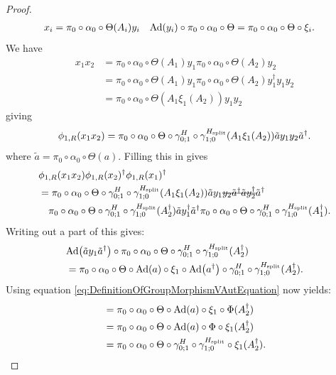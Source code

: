 \documentclass[11pt,a4paper,twoside]{article}
\numberwithin{equation}{section}
\begin{document}
\begin{proof}
		\begin{align}
			x_i&=\pi_0\circ\alpha_0\circ\Theta(A_i)y_i&\Ad{y_i}\circ\pi_0\circ\alpha_0\circ\Theta&=\pi_0\circ\alpha_0\circ\Theta\circ\xi_i.
		\end{align}
		We have
		\begin{align}
			x_1x_2&=\pi_0\circ\alpha_0\circ\Theta(A_1)y_1\pi_0\circ\alpha_0\circ\Theta(A_2)y_2\\
			&=\pi_0\circ\alpha_0\circ\Theta(A_1)y_1\pi_0\circ\alpha_0\circ\Theta(A_2)y_1^{\dagger}y_1y_2\\
			&=\pi_0\circ\alpha_0\circ\Theta(A_1\xi_1(A_2))y_1y_2
		\end{align}
		giving
		\begin{equation}
			\phi_{1,R}(x_1x_2)=\pi_0\circ\alpha_0\circ\Theta\circ\gamma^H_{0;1}\circ\gamma^{{H_{\text{split}}}}_{1;0}(A_1\xi_1(A_2))\tilde{a}y_1y_2\tilde{a}^\dagger.
		\end{equation}
		where $\tilde{a}=\pi_0\circ\alpha_0\circ\Theta(a)$. Filling this in gives
		\begin{align}
			&\phi_{1,R}(x_1x_2)\phi_{1,R}(x_2)^\dagger\phi_{1,R}(x_1)^\dagger\\
			\label{eq:HomomorphismCondition}
			&=\pi_0\circ\alpha_0\circ\Theta\circ\gamma^H_{0;1}\circ\gamma^{\Hsplit}_{1;0}(A_1\xi_1(A_2))\tilde{a}y_1\stkout{y_2\tilde{a}^\dagger \tilde{a}y_2^\dagger}\tilde{a}^\dagger\\
			\nonumber
			&\quad\pi_0\circ\alpha_0\circ\Theta\circ\gamma^H_{0;1}\circ\gamma^{\Hsplit}_{1;0}(A_2^\dagger)\tilde{a}y_1^\dagger\tilde{a}^\dagger \pi_0\circ\alpha_0\circ\Theta\circ\gamma^H_{0;1}\circ\gamma^{\Hsplit}_{1;0}(A_1^\dagger).
		\end{align}
		Writing out a part of this gives:
		\begin{align}
			&\Ad{\tilde{a}y_1\tilde{a}^\dagger}\circ\pi_0\circ\alpha_0\circ\Theta\circ\gamma^H_{0;1}\circ\gamma^{\Hsplit}_{1;0}(A_2^\dagger)\\
			&=\pi_0\circ\alpha_0\circ\Theta\circ\Ad{a}\circ\xi_1\circ\Ad{a^\dagger}\circ\gamma^H_{0;1}\circ\gamma^{\Hsplit}_{1;0}(A_2^\dagger).
		\end{align}
		Using equation \eqref{eq:DefinitionOfGroupMorphismVAutEquation} now yields:
		\begin{align}
			&=\pi_0\circ\alpha_0\circ\Theta\circ\Ad{a}\circ\xi_1\circ\Phi(A_2^\dagger)\\
			&=\pi_0\circ\alpha_0\circ\Theta\circ\Ad{a}\circ\Phi\circ\xi_1(A_2^\dagger)\\
			&=\pi_0\circ\alpha_0\circ\Theta\circ\gamma^H_{0;1}\circ\gamma^{\Hsplit}_{1;0}\circ\xi_1(A_2^\dagger).

\end{align}
\end{proof}
\end{document}

